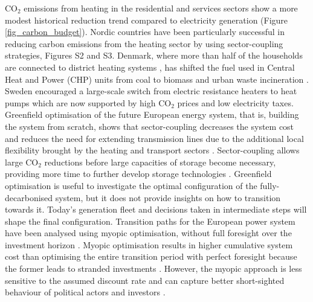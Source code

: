 \documentclass[5p]{elsarticle} %
\begin{document}
CO$_2$ emissions from heating in the residential and services sectors show a more modest historical reduction trend compared to electricity generation (Figure \ref{fig_carbon_budget}). Nordic countries have been particularly successful in reducing carbon emissions from the heating sector by using sector-coupling strategies, Figures S2 and S3. Denmark, where more than half of the households are connected to district heating systems \cite{Gross_2019}, has shifted the fuel used in Central Heat and Power (CHP) units from coal to biomass and urban waste incineration \cite{DEA_2015}. Sweden encouraged a large-scale switch from electric resistance heaters to heat pumps \cite{Gross_2019} which are now supported by high CO$_2$ prices \cite{Carbon_pricing_2019} and low electricity taxes.\\ 

Greenfield optimisation of the future European energy system, that is, building the system from scratch, shows that sector-coupling decreases the system cost and reduces the need for extending transmission lines due to the additional local flexibility brought by the heating and transport sectors \cite{Brown_2018}. Sector-coupling allows large CO$_2$ reductions before large capacities of storage become necessary, providing more time to further develop storage technologies \cite{Victoria_2019_storage}. Greenfield optimisation is useful to investigate the optimal configuration of the fully-decarbonised system, but it does not provide insights on how to transition towards it. Today's generation fleet and decisions taken in intermediate steps will shape the final configuration. Transition paths for the European power system have been analysed using myopic optimisation, without full foresight over the investment horizon \cite{Bogdanov_2019, Plesmann_2017, Gerbaulet_2019, Poncelet_2016}. Myopic optimisation results in higher cumulative system cost than optimising the entire transition period with perfect foresight because the former leads to stranded investments \cite{Gerbaulet_2019, Heuberger_2018}. However, the myopic approach is less sensitive to the assumed discount rate and can capture better short-sighted behaviour of political actors and investors \cite{Poncelet_2016, Gerbaulet_2019}. \\
\end{document}
